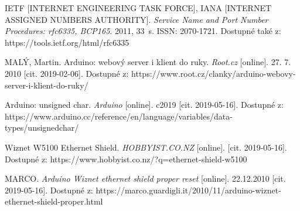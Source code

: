 \begin{thebibliography}{20}
IETF [INTERNET ENGINEERING TASK FORCE], IANA [INTERNET ASSIGNED NUMBERS AUTHORITY]. \textit{Service Name and Port Number Procedures: rfc6335, BCP165}. 2011, 33~s. ISSN: 2070-1721. Dostupné také z: https://tools.ietf.org/html/rfc6335

MALÝ, Martin. Arduino: webový server i klient do ruky. \textit{Root.cz} [online]. 27. 7. 2010 [cit. 2019-02-06]. Dostupné z: https://www.root.cz/clanky/arduino-webovy-server-i-klient-do-ruky/

Arduino: unsigned char. \textit{Arduino} [online]. c2019 [cit. 2019-05-16]. Dostupné z: https://www.arduino.cc/reference/en/language/variables/data-types/unsignedchar/

Wiznet W5100 Ethernet Shield. \textit{HOBBYIST.CO.NZ} [online]. [cit. 2019-05-16]. Dostupné z: https://www.hobbyist.co.nz/?q=ethernet-shield-w5100

MARCO. \textit{Arduino Wiznet ethernet shield proper reset} [online]. 22.12.2010 [cit. 2019-05-16]. Dostupné z: https://marco.guardigli.it/2010/11/arduino-wiznet-ethernet-shield-proper.html

\end{thebibliography}

